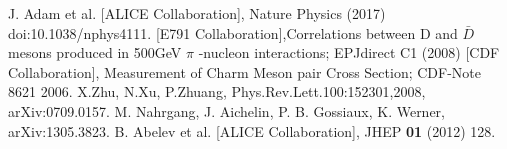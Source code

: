 \begin{thebibliography}{99}
 J. Adam et al. [ALICE Collaboration], Nature Physics (2017) doi:10.1038/nphys4111.
 [E791 Collaboration],Correlations between D and $\bar{D}$ mesons produced in 500GeV $\pi$ -nucleon interactions; EPJdirect C1 (2008)
 [CDF Collaboration], Measurement of Charm Meson pair Cross Section; CDF-Note 8621 2006.
 X.Zhu, N.Xu, P.Zhuang, Phys.Rev.Lett.100:152301,2008, arXiv:0709.0157.
 M. Nahrgang, J. Aichelin, P. B. Gossiaux, K. Werner, arXiv:1305.3823.
 B. Abelev et al. [ALICE Collaboration], JHEP {\bf 01} (2012) 128.

\end{thebibliography}